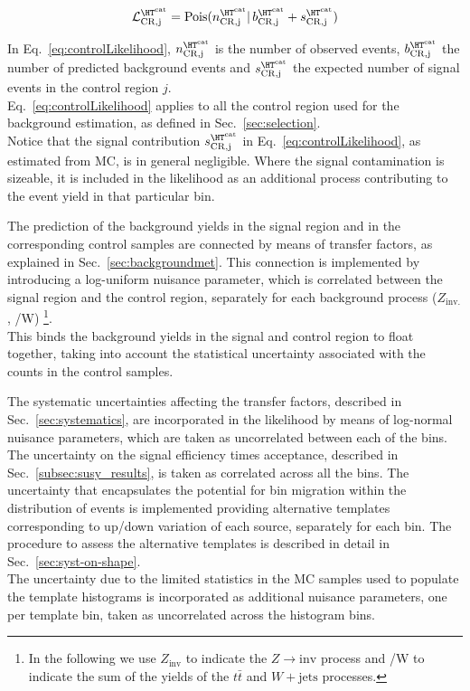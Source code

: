 \begin{equation}
\mathcal{L}^{\htcat}_{\mathrm{CR,j}}=\mathrm{Pois}(n^{\htcat}_{\mathrm{CR,j}} |\, b^{\htcat}_{\mathrm{CR,j}} + s^{\htcat}_{\mathrm{CR,j}})
\label{eq:controlLikelihood}
\end{equation}

In Eq.~\ref{eq:controlLikelihood}, $n^{\htcat}_{\mathrm{CR,j}}$ is the number of observed events, $b^{\htcat}_{\mathrm{CR,j}}$ the number of predicted 
background events and $s^{\htcat}_{\mathrm{CR,j}}$ the expected number of signal events in the control region $j$. \\
Eq.~\ref{eq:controlLikelihood} applies to all the control region used for the background estimation, 
as defined in Sec.~\ref{sec:selection}. \\
Notice that the signal contribution $s^{\htcat}_{\mathrm{CR,j}}$ in Eq.~\ref{eq:controlLikelihood}, as estimated from MC, is in general negligible. 
Where the signal contamination is sizeable, it is included in the likelihood as an additional process contributing to the event yield in that particular bin.

The prediction of the background yields in the signal region and in the corresponding control samples are connected 
by means of transfer factors, as explained in Sec.~\ref{sec:backgroundmet}. 
This connection is implemented by introducing a log-uniform nuisance parameter, which is correlated 
between the signal region and the control region, separately for each background process ($Z_{\mathrm{inv.}}$, \ttbar/W) \footnote{In the following we use $Z_{\mathrm{inv}}$ to indicate the $Z\to \mathrm{inv}$ process and \ttbar/W to indicate the sum of the yields of the $t\bar{t}$ and $W+\mathrm{jets}$ processes.}. \\
This binds the background yields in the signal and control region to float together, 
taking into account the statistical uncertainty associated with the counts in the control samples. 

The systematic uncertainties affecting the transfer factors, described in Sec.~\ref{sec:systematics}, 
are incorporated in the likelihood by means of log-normal nuisance parameters, 
which are taken as uncorrelated between each of the \htcat bins.
The uncertainty on the signal efficiency times acceptance, described in Sec.~\ref{subsec:susy_results}, is taken as correlated across all the \htcat bins. 
The uncertainty that encapsulates the potential for bin migration within the \mht distribution of events is implemented providing alternative templates corresponding to up/down variation of each source, separately for each \htcat bin. The procedure to assess the alternative templates is described in detail in Sec.~\ref{sec:syst-on-shape}. \\
The uncertainty due to the limited statistics in the MC samples used to populate the template histograms is incorporated 
as additional nuisance parameters, one per template bin, taken as uncorrelated across the histogram bins. 

